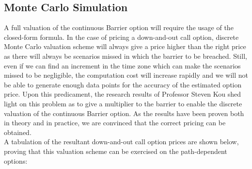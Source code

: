 \subsection{Monte Carlo Simulation}
A full valuation of the continuous Barrier option will require the usage of the closed-form formula. In the case of pricing a down-and-out call option, discrete Monte Carlo valuation scheme will always give a price higher than the right price as there will always be scenarios missed in which the barrier to be breached. Still, even if we can find an increment in the time zone which can make the scenarios missed to be negligible, the computation cost will increase rapidly and we will not be able to generate enough data points for the accuracy of the estimated option price. Upon this predicament, the research results of Professor Steven Kou shed light on this problem as to give a multiplier to the barrier to enable the discrete valuation of the continuous Barrier option. As the results have been proven both in theory and in practice, we are convinced that the correct pricing can be obtained.
\\
A tabulation of the resultant down-and-out call option prices are shown below, proving that this valuation scheme can be exercised on the path-dependent options:
